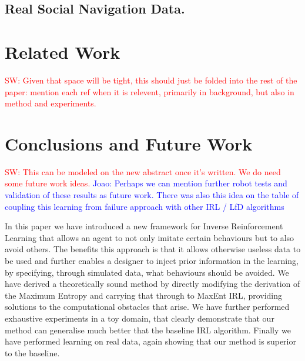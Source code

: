\documentclass[letterpaper]{article}
\newcommand{\sw}[1]{\textcolor{red}{SW: #1}}
\newcommand{\jm}[1]{\textcolor{blue}{Joao: #1}}
\newcommand{\sw}[1]{}
\newcommand{\jm}[1]{}
\begin{document}
\subsection{Real Social Navigation Data.}

\section{Related Work}

\sw{Given that space will be tight, this should just be folded into the rest of the paper: mention each ref when it is relevent, primarily in background, but also in method and experiments.}


\section{Conclusions and Future Work}

\sw{This can be modeled on the new abstract once it's written.  We do need some future work ideas.} \jm{Perhaps we can mention further robot tests and validation of these results as future work. There was also this idea on the table of coupling this learning from failure approach with other IRL / LfD algorithms}

In this paper we have introduced a new framework for Inverse Reinforcement Learning that allows an agent to not only imitate certain behaviours but to also avoid others. The benefits this approach is that it allows otherwise useless data to be used and further enables a designer to inject prior information in the learning, by specifying, through simulated data, what behaviours should be avoided. We have derived a theoretically sound method by directly modifying the derivation of the Maximum Entropy and carrying that through to MaxEnt IRL, providing solutions to the computational obstacles that arise. We have further performed exhaustive experiments in a toy domain, that clearly demonstrate that our method can generalise much better that the baseline IRL algorithm. Finally we have performed learning on real data, again showing that our method is superior to the baseline.  



	
\end{document}

